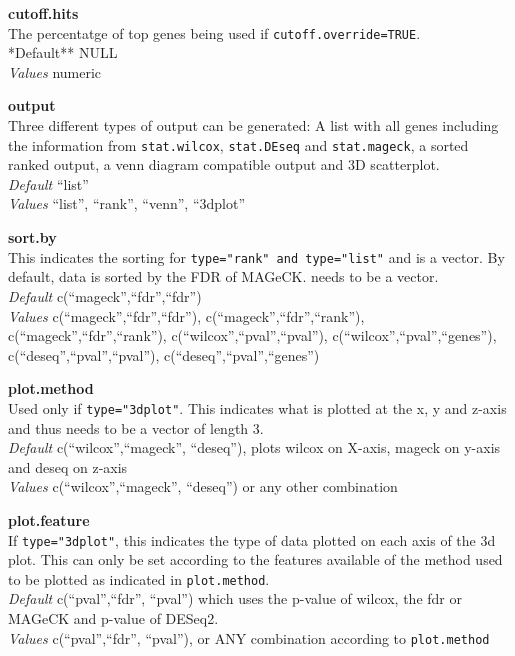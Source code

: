 \documentclass[]{article}
\begin{document}
\textbf{cutoff.hits}\\
The percentatge of top genes being used if
\texttt{cutoff.override=TRUE}.\\
*Default** NULL\\
\emph{Values} numeric

\textbf{output}\\
Three different types of output can be generated: A list with all genes
including the information from \texttt{stat.wilcox}, \texttt{stat.DEseq}
and \texttt{stat.mageck}, a sorted ranked output, a venn diagram
compatible output and 3D scatterplot.\\
\emph{Default} ``list''\\
\emph{Values} ``list'', ``rank'', ``venn'', ``3dplot''

\textbf{sort.by}\\
This indicates the sorting for \texttt{type="rank"\ and\ type="list"}
and is a vector. By default, data is sorted by the FDR of MAGeCK. needs
to be a vector.\\
\emph{Default} c(``mageck'',``fdr'',``fdr'')\\
\emph{Values} c(``mageck'',``fdr'',``fdr''),
c(``mageck'',``fdr'',``rank''), c(``mageck'',``fdr'',``rank''),
c(``wilcox'',``pval'',``pval''), c(``wilcox'',``pval'',``genes''),
c(``deseq'',``pval'',``pval''), c(``deseq'',``pval'',``genes'')

\textbf{plot.method}\\
Used only if \texttt{type="3dplot"}. This indicates what is plotted at
the x, y and z-axis and thus needs to be a vector of length 3.\\
\emph{Default} c(``wilcox'',``mageck'', ``deseq''), plots wilcox on
X-axis, mageck on y-axis and deseq on z-axis\\
\emph{Values} c(``wilcox'',``mageck'', ``deseq'') or any other
combination

\textbf{plot.feature}\\
If \texttt{type="3dplot"}, this indicates the type of data plotted on
each axis of the 3d plot. This can only be set according to the features
available of the method used to be plotted as indicated in
\texttt{plot.method}.\\
\emph{Default} c(``pval'',``fdr'', ``pval'') which uses the p-value of
wilcox, the fdr or MAGeCK and p-value of DESeq2.\\
\emph{Values} c(``pval'',``fdr'', ``pval''), or ANY combination
according to \texttt{plot.method}

\newpage
\end{document}

